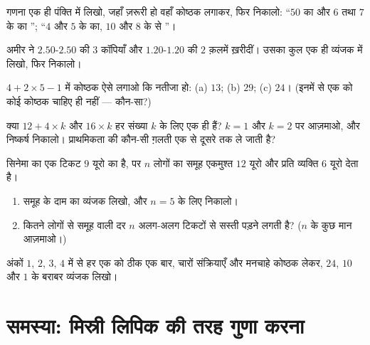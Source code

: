 \begin{exercise}[$\star$]\label{exo:g7:priorities:6}
गणना एक ही पंक्ति में लिखो, जहाँ ज़रूरी हो वहाँ कोष्ठक लगाकर, फिर
निकालो: ``$50$ का और $6$ तथा $7$ के  का '';
``$4$ और $5$ के  का, $10$ और $8$ के  से
''।
\end{exercise}

\begin{exercise}[$\star$]\label{exo:g7:priorities:7}
अमीर ने $2.50$-$2.50$ की $3$ कॉपियाँ और $1.20$-$1.20$ की $2$
क़लमें ख़रीदीं। उसका कुल एक ही व्यंजक में लिखो, फिर निकालो।
\end{exercise}

\begin{exercise}[$\star\star$]\label{exo:g7:priorities:8}
$4 + 2 \times 5 - 1$ में कोष्ठक ऐसे लगाओ कि नतीजा हो: (a) $13$;
(b) $29$; (c) $24$। (इनमें से एक को कोई कोष्ठक चाहिए ही नहीं ---
कौन-सा?)
\end{exercise}

\begin{exercise}[$\star\star$]\label{exo:g7:priorities:9}
क्या $12 + 4 \times k$ और $16 \times k$ हर संख्या $k$ के लिए एक
ही हैं? $k = 1$ और $k = 2$ पर आज़माओ, और निष्कर्ष निकालो।
प्राथमिकता की कौन-सी ग़लती एक से दूसरे तक ले जाती है?
\end{exercise}

\begin{exercise}[$\star\star$]\label{exo:g7:priorities:10}
सिनेमा का एक टिकट $9$ यूरो का है, पर $n$ लोगों का समूह एकमुश्त
$12$ यूरो और प्रति व्यक्ति $6$ यूरो देता है।
\begin{enumerate}
  \item समूह के दाम का व्यंजक लिखो, और $n = 5$ के लिए निकालो।
  \item कितने लोगों से समूह वाली दर $n$ अलग-अलग टिकटों से सस्ती
        पड़ने लगती है? ($n$ के कुछ मान आज़माओ।)
\end{enumerate}
\end{exercise}

\begin{exercise}[$\star\star\star$]\label{exo:g7:priorities:11}
अंकों $1$, $2$, $3$, $4$ में से हर एक को ठीक एक बार, चारों
संक्रियाएँ और मनचाहे कोष्ठक लेकर, $24$, $10$ और $1$ के बराबर
व्यंजक लिखो।
\end{exercise}

\section{समस्या: मिस्री लिपिक की तरह गुणा करना}

